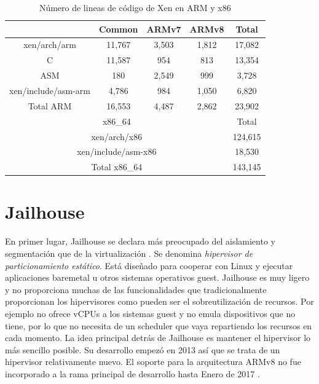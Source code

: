 \begin{table}[ht]

	\label{table:results45}
  \centering

	\begin{tabular}{ |c|c|c|c|c| }
		\hline
     & Common & ARMv7 & ARMv8 & Total\\
    \hline
    xen/arch/arm          & 11,767      & 3,503  & 1,812   & 17,082 \\
    \hline
    C                     & 11,587      & 954    & 813	    & 13,354 \\
    \hline
    ASM                   & 180         & 2,549  & 999     & 3,728  \\
    \hline
    xen/include/asm-arm   & 4,786       & 984    & 1,050   & 6,820  \\
    \hline
    Total ARM	            & 16,553  & 4,487  & 2,862        & 23,902 \\
    \hline
    \multicolumn{4}{|c|}{x86\_64}                           & Total\\
    \hline
    \multicolumn{4}{|c|}{xen/arch/x86}                      & 124,615\\
    \hline
    \multicolumn{4}{|c|}{xen/include/asm-x86}               & 18,530 \\
    \hline
    \multicolumn{4}{|c|}{Total x86\_64}                     & 143,145\\
    \hline
	\end{tabular}
	\caption{Número de lineas de código de Xen en ARM y x86 \cite{xen_arm_whitepaper}}

\end{table}

\section{Jailhouse} \label{jailhouse_sota}

En primer lugar, Jailhouse se declara más preocupado del aislamiento y segmentación que de la virtualización \cite{jailhouse_p1}. Se denomina \textit{hipervisor de particionamiento estático}. Está diseñado para cooperar con Linux y ejecutar aplicaciones baremetal u otros sistemas operativos guest. Jailhouse es muy ligero y no proporciona muchas de las funcionalidades que tradicionalmente proporcionan los hipervisores como pueden ser el sobreutilización de recursos. Por ejemplo no ofrece vCPUs a los sistemas guest y no emula dispositivos que no tiene, por lo que no necesita de un scheduler que vaya repartiendo los recursos en cada momento. La idea principal detrás de Jailhouse es mantener el hipervisor lo más sencillo posible. Su desarrollo empezó en 2013 así que se trata de un hipervisor relativamente nuevo. El soporte para la arquitectura ARMv8 no fue incorporado a la rama principal de desarrollo hasta Enero de 2017 \cite{jailhouse_elc2017}.\\

